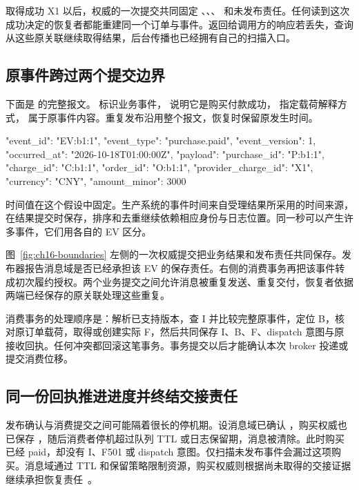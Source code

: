 取得成功 X1 以后，权威的一次提交共同固定 、、、 和未发布责任。任何读到这次成功决定的恢复者都能重建同一个订单与事件。返回给调用方的响应若丢失，查询从这些原关联继续取得结果，后台传播也已经拥有自己的扫描入口。

\subsection{原事件跨过两个提交边界}

下面是  的完整报文。 标识业务事件， 说明它是购买付款成功， 指定载荷解释方式， 属于原事件内容。重复发布沿用整个报文，恢复时保留原发生时间。

\begin{BookCode}
{
  "event_id": "EV:b1:1",
  "event_type": "purchase.paid",
  "event_version": 1,
  "occurred_at": "2026-10-18T01:00:00Z",
  "payload": {
    "purchase_id": "P:b1:1",
    "charge_id": "C:b1:1",
    "order_id": "O:b1:1",
    "provider_charge_id": "X1",
    "currency": "CNY",
    "amount_minor": 3000
  }
}
\end{BookCode}

时间值在这个假设中固定。生产系统的事件时间来自受理结果所采用的时间来源，在结果提交时保存，排序和去重继续依赖相应身份与日志位置。同一秒可以产生许多事件，它们用各自的 EV 区分。


图~\ref{fig:ch16-boundaries} 左侧的一次权威提交把业务结果和发布责任共同保存。发布器报告消息域是否已经承担该 EV 的保存责任。右侧的消费事务再把该事件转成初次履约授权。两个业务提交之间允许消息被重复发送、重复交付，恢复者依据两端已经保存的原关联处理这些重复。

消费事务的处理顺序是：解析已支持版本，查 I 并比较完整原事件，定位 B，核对原订单载荷，取得或创建实际 F，然后共同保存 I、B、F、dispatch 意图与原接收回执。任何冲突都回滚这笔事务。事务提交以后才能确认本次 broker 投递或提交消费位移。

\subsection{同一份回执推进进度并终结交接责任}
\label{sec:ch16-handoff}

发布确认与消费提交之间可能隔着很长的停机期。设消息域已确认 ，购买权威也已保存 ，随后消费者停机超过队列 TTL 或日志保留期，消息被清除。此时购买已经 paid，却没有 I、F501 或 dispatch 意图。仅扫描未发布事件会漏过这项购买。消息域通过 TTL 和保留策略限制资源，购买权威则根据尚未取得的交接证据继续承担恢复责任~\cite{rabbitmq-queues,kafka-design}。

